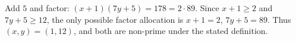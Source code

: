 Add $5$ and factor: $(x+1)(7y+5)=178=2\cdot89$. Since $x+1\ge2$ and $7y+5\ge12$, the only possible factor allocation is $x+1=2$, $7y+5=89$. Thus $\boxed{(x,y)=(1,12)}$, and both are non-prime under the stated definition.
